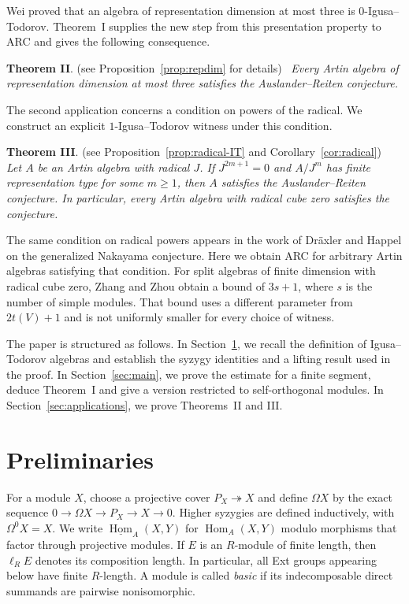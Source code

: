 \documentclass[a4paper,reqno]{amsart}
\numberwithin{equation}{section}
\theoremstyle{definition}
\DeclareMathOperator{\Hom}{Hom}
\newcommand{\stHom}{\underline{\Hom}}
\newcommand{\len}{\ell_R}
\begin{document}
Wei \cite[Lemma~2.1]{Wei2008} proved that an algebra of representation dimension at most three is $0$-Igusa--Todorov. Theorem~I supplies the new step from this presentation property to ARC and gives the following consequence.

\vskip 5pt
\noindent\textbf{Theorem II}.\; {\rm  (see Proposition~\ref{prop:repdim} for details)}~ \emph{Every Artin algebra of representation dimension at most three satisfies the Auslander--Reiten conjecture.}
\vskip 5pt

The second application concerns a condition on powers of the radical. We construct an explicit $1$-Igusa--Todorov witness under this condition. 

\vskip 5pt
\noindent\textbf{Theorem III}.\; {\rm (see Proposition~\ref{prop:radical-IT} and Corollary~\ref{cor:radical})}~ \emph{Let $A$ be an Artin algebra with radical $J$. If $J^{2m+1}=0$ and $A/J^m$ has finite representation type for some $m\geq1$, then $A$ satisfies the Auslander--Reiten conjecture. In particular, every Artin algebra with radical cube zero satisfies the conjecture.}
\vskip 5pt

The same condition on radical powers appears in the work of Dr\"axler and Happel \cite{DH1992} on the generalized Nakayama conjecture. Here we obtain ARC for arbitrary Artin algebras satisfying that condition. For split algebras of finite dimension with radical cube zero, Zhang and Zhou \cite[Theorem~1.1]{ZZ2026} obtain a bound of $3s+1$, where $s$ is the number of simple modules. That bound uses a different parameter from $2t(V)+1$ and is not uniformly smaller for every choice of witness.

The paper is structured as follows. In Section~\ref{sec:preliminaries}, we recall the definition of Igusa--Todorov algebras and establish the syzygy identities and a lifting result used in the proof. In Section~\ref{sec:main}, we prove the estimate for a finite segment, deduce Theorem~I and give a version restricted to self-orthogonal modules. In Section~\ref{sec:applications}, we prove Theorems~II and III.

\section{Preliminaries}\label{sec:preliminaries}

For a module $X$, choose a projective cover $P_X\twoheadrightarrow X$ and define $\Omega X$ by the exact sequence $0\to\Omega X\to P_X\to X\to0$. Higher syzygies are defined inductively, with $\Omega^0X=X$. We write $\stHom_A(X,Y)$ for $\Hom_A(X,Y)$ modulo morphisms that factor through projective modules. If $E$ is an $R$-module of finite length, then $\len E$ denotes its composition length. In particular, all Ext groups appearing below have finite $R$-length. A module is called \emph{basic} if its indecomposable direct summands are pairwise nonisomorphic.
\end{document}
